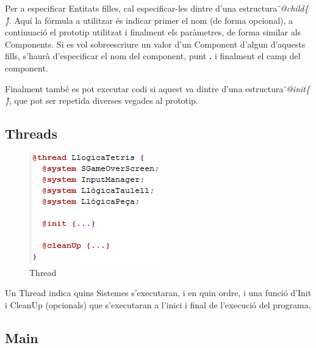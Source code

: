 Per a especificar Entitats filles, cal especificar-les dintre d'una estructura {\em\"{}@child\{ \}\"{}}. Aquí la fórmula a utilitzar és indicar primer el nom (de forma opcional), a continuació el prototip utilitzat i finalment els paràmetres, de forma similar als Components. Si es vol sobreescriure un valor d'un Component d'algun d'aquests fills, s'haurà d'especificar el nom del component, punt {\bf .} i finalment el camp del component.

Finalment també es pot executar codi si aquest va dintre d'una estructura {\em\"{}@init\{ \}\"{}}, que pot ser repetida diverses vegades al prototip.

\subsection{Threads}

%  
%  

\begin{figure}[h!]
  \includegraphics{./img/ExempleThread.png}
  \caption{Thread}
\end{figure}

Un Thread indica quins Sistemes s'executaran, i en quin ordre, i una funció d'Init i CleanUp (opcionals) que s'executaran a l'inici i final de l'execució del programa.

\subsection{Main}

%  
%  

